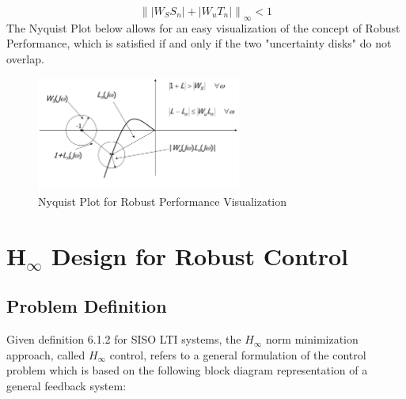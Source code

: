 \documentclass[a4paper,10pt,titlepage]{article}
\numberwithin{equation}{subsection}
\begin{document}
	\begin{equation}
		\left\lVert \left| W_SS_n \right| + \left| W_uT_n \right | \right\rVert_\infty < 1
	\end{equation}
	The Nyquist Plot below allows for an easy visualization of the concept of Robust Performance, which is satisfied if and only if the two "uncertainty disks" do not overlap.
	
	\begin{figure}[H] %
		\centering
		\includegraphics[width=0.6\textwidth]{images/RS_NP_proof.png}
		\caption{Nyquist Plot for Robust Performance Visualization}
		\label{fig:image10}
	\end{figure}
	
	\section{$\bm{H_\infty}$ Design for Robust Control}
	\subsection{Problem Definition}
	Given definition 6.1.2 for SISO LTI systems, the $H_\infty$ norm minimization approach, called $H_\infty$ control, refers to a general formulation of the control problem which is based on the following block diagram representation of a general feedback system:
	
\end{document}
